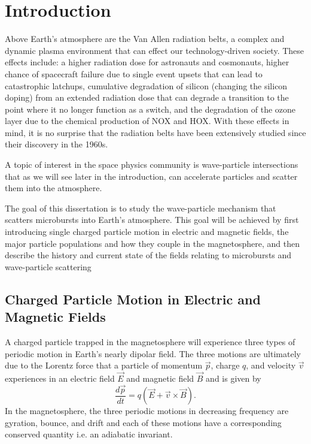 \chapter{Introduction}\label{CH:introduction}
Above Earth's atmosphere are the Van Allen radiation belts, a complex and dynamic plasma environment that can effect our technology-driven society. These effects include: a higher radiation dose for astronauts and cosmonauts, higher chance of spacecraft failure due to single event upsets that can lead to catastrophic latchups, cumulative degradation of silicon (changing the silicon doping) from an extended radiation dose that can degrade a transition to the point where it no longer function as a switch, and the degradation of the ozone layer due to the chemical production of NOX and HOX. With these effects in mind, it is no surprise that the radiation belts have been extensively studied since their discovery in the 1960s.

A topic of interest in the space physics community is wave-particle intersections that as we will see later in the introduction, can accelerate particles and scatter them into the atmosphere.

The goal of this dissertation is to study the wave-particle mechanism that scatters microbursts into Earth's atmosphere. This goal will be achieved by first introducing single charged particle motion in electric and magnetic fields, the major particle populations and how they couple in the magnetosphere, and then describe the history and current state of the fields relating to microbursts and wave-particle scattering

\section{Charged Particle Motion in Electric and Magnetic Fields}\label{Intro:particle_motion}
A charged particle trapped in the magnetosphere will experience three types of periodic motion in Earth's nearly dipolar field. The three motions are ultimately due to the Lorentz force that a particle of momentum $\vec{p}$, charge $q$, and velocity $\vec{v}$ experiences in an electric field $\vec{E}$ and magnetic field $\vec{B}$ and is given by
\begin{equation}
\frac{d\vec{p}}{dt} = q(\vec{E} + \vec{v} \times \vec{B}).
\end{equation} In the magnetosphere, the three periodic motions in decreasing frequency are gyration, bounce, and drift and each of these motions have a corresponding conserved quantity i.e. an adiabatic invariant. 

